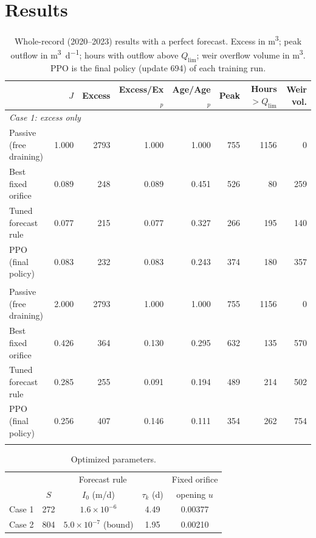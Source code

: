 \documentclass[11pt]{article}
\begin{document}
\section{Results}
\begin{table}[t]
\centering\small
\caption{Whole-record (2020--2023) results with a perfect forecast. Excess in
\si{\m^3}; peak outflow in \si{\m^3\per\day}; hours with outflow above $Q_{\lim}$; weir
overflow volume in \si{\m^3}. PPO is the final policy (update 694) of each training run.}
\label{tab:main}
\begin{tabular}{lrrrrrrr}
\toprule
 & $J$ & Excess & Excess/Ex$_p$ & Age/Age$_p$ & Peak & Hours $>Q_{\lim}$ & Weir vol.\\
\midrule
\multicolumn{8}{l}{\emph{Case 1: excess only}}\\
Passive (free draining) & 1.000 & 2793 & 1.000 & 1.000 & 755 & 1156 & 0\\
Best fixed orifice & 0.089 & 248 & 0.089 & 0.451 & 526 & 80 & 259\\
Tuned forecast rule & 0.077 & 215 & 0.077 & 0.327 & 266 & 195 & 140\\
PPO (final policy) & 0.083 & 232 & 0.083 & 0.243 & 374 & 180 & 357\\
\addlinespace
\multicolumn{8}{l}{\emph{Case 2: excess + residence time}}\\
Passive (free draining) & 2.000 & 2793 & 1.000 & 1.000 & 755 & 1156 & 0\\
Best fixed orifice & 0.426 & 364 & 0.130 & 0.295 & 632 & 135 & 570\\
Tuned forecast rule & 0.285 & 255 & 0.091 & 0.194 & 489 & 214 & 502\\
PPO (final policy) & 0.256 & 407 & 0.146 & 0.111 & 354 & 262 & 754\\
\addlinespace
\bottomrule
\end{tabular}
\end{table}

\begin{table}[t]
\centering\small
\caption{Optimized parameters.}
\label{tab:params}
\begin{tabular}{lccc|c}
\toprule
 & \multicolumn{3}{c|}{Forecast rule} & Fixed orifice\\
 & $S$ & $I_0$ (m/d) & $\tau_k$ (d) & opening $u$\\
\midrule
Case 1 & 272 & $1.6\times10^{-6}$ & 4.49 & 0.00377\\
Case 2 & 804 & $5.0\times10^{-7}$ (bound) & 1.95 & 0.00210\\
\bottomrule
\end{tabular}
\end{table}
\end{document}

